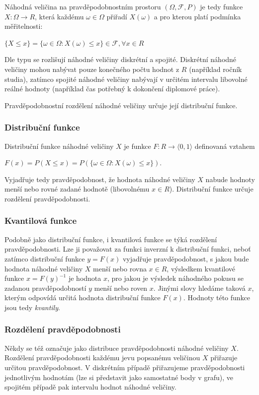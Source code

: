 \documentclass[thesis=M,czech]{FITthesis}[2014/05/07]
\begin{document}
Náhodná veličina na pravděpodobnostním prostoru $(\Omega,\mathcal{F},P)$ je tedy funkce $X: \Omega \to R$, která každému $\omega \in \Omega$ přiřadí $X(\omega)$ a pro kterou platí podmínka měřitelnosti:

\begin{center}
$\{ X \leq x \} = \{ \omega \in \Omega: X(\omega) \leq x \} \in \mathcal{F}, \forall x \in R$
\end{center}

Dle typu se rozlišují náhodné veličiny diskrétní a spojité. Diskrétní náhodné veličiny mohou nabývat pouze konečného počtu hodnot z $R$ (například ročník studia), zatímco spojité náhodné veličiny nabývají v určitém intervalu libovolné reálné hodnoty (například čas potřebný k dokončení diplomové práce). 

Pravděpodobnostní rozdělení náhodné veličiny určuje její distribuční funkce. 

\subsubsection{Distribuční funkce}
\label{cdf}
Distribuční funkce náhodné veličiny $X$ je funkce $F: R \to \langle0,1\rangle$ definovaná vztahem 

\begin{center}
$F(x) = P(X \leq x) = P(\{ \omega \in \Omega: X(\omega) \leq x \})$.
\end{center}

Vyjadřuje tedy pravděpodobnost, že hodnota náhodné veličiny $X$ nabude hodnoty menší nebo rovné zadané hodnotě (libovolnému $x \in R$). Distribuční funkce určuje rozdělení pravděpodobnosti.

\subsubsection{Kvantilová funkce}
\label{icdf}
\cite{pst2} Podobně jako distribuční funkce, i kvantilová funkce se týká rozdělení pravděpodobnosti. Lze ji považovat za funkci inverzní k distribuční funkci, neboť zatímco distribuční funkce $y = F(x)$ vyjadřuje pravděpodobnost, s jakou bude hodnota náhodné veličiny $X$ menší nebo rovna $x \in R$, výsledkem kvantilové funkce $x = F(y)^{-1}$ je hodnota $x$, pro jakou je výsledek náhodného pokusu se zadanou pravděpodobností $y$ menší nebo roven $x$. Jinými slovy hledáme taková $x$, kterým odpovídá určitá hodnota distribuční funkce $F(x)$. Hodnoty této funkce jsou tedy \emph{kvantily}.

\subsubsection{Rozdělení pravděpodobnosti}
\label{distr}
Někdy se též označuje jako distribuce pravděpodobnosti náhodné veličiny $X$. 
Rozdělení pravděpodobnosti každému jevu popsanému veličinou $X$ přiřazuje určitou pravděpodobnost. V diskrétním případě přiřazujeme pravděpodobnosti jednotlivým hodnotám (lze si představit jako samostatné body v grafu), ve spojitém případě pak intervalu hodnot náhodné veličiny. 
\end{document}
